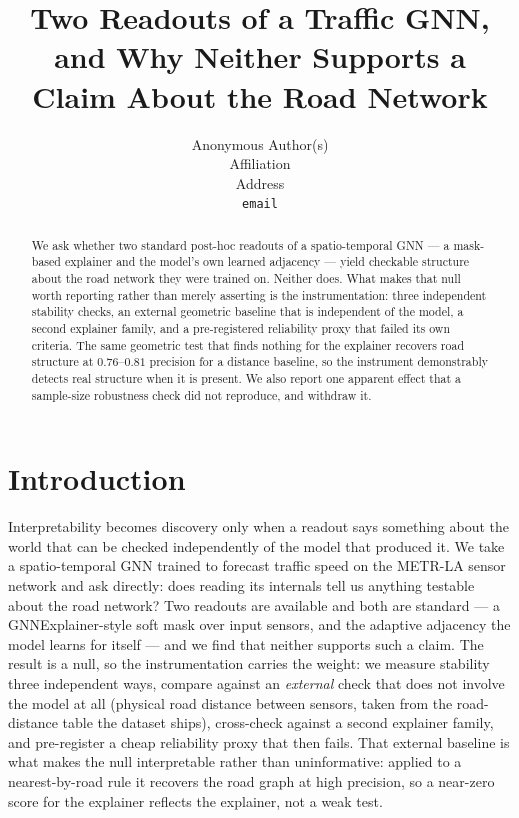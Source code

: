\documentclass{article}
\title{Two Readouts of a Traffic GNN, and Why Neither Supports a Claim About the
Road Network}
\author{%
  Anonymous Author(s)\\
  Affiliation\\
  Address\\
  \texttt{email}
}
\begin{document}
\maketitle

\begin{abstract}
We ask whether two standard post-hoc readouts of a spatio-temporal GNN --- a
mask-based explainer and the model's own learned adjacency --- yield checkable
structure about the road network they were trained on. Neither does. What makes
that null worth reporting rather than merely asserting is the instrumentation:
three independent stability checks, an external geometric baseline that is
independent of the model, a second explainer family, and a pre-registered
reliability proxy that failed its own criteria. The same geometric test that finds
nothing for the explainer recovers road structure at $0.76$--$0.81$ precision for a
distance baseline, so the instrument demonstrably detects real structure when it is
present. We also report one apparent effect that a sample-size robustness check did
not reproduce, and withdraw it.
\end{abstract}

\section{Introduction}

Interpretability becomes discovery only when a readout says something about the
world that can be checked independently of the model that produced it. We take a
spatio-temporal GNN trained to forecast traffic speed on the METR-LA sensor network
and ask directly: does reading its internals tell us anything testable about the
road network? Two readouts are available and both are standard --- a GNNExplainer-style
soft mask over input sensors, and the adaptive adjacency the model learns for itself
--- and we find that neither supports such a claim. The result is a null, so the
instrumentation carries the weight: we measure stability three independent ways,
compare against an \emph{external} check that does not involve the model at all
(physical road distance between sensors, taken from the road-distance table the
dataset ships), cross-check against a second explainer family, and pre-register a
cheap reliability proxy that then fails. That external baseline is what makes the
null interpretable rather than uninformative: applied to a nearest-by-road rule it
recovers the road graph at high precision, so a near-zero score for the explainer
reflects the explainer, not a weak test.
\end{document}
